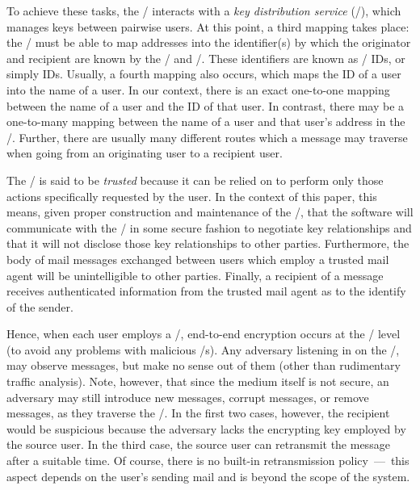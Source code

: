 To achieve these tasks,
the \TMA/ interacts with a {\it key distribution service} (\KDS/),
which manages keys between pairwise users.
At this point, a third mapping takes place:
the \UA/ must be able to map addresses into the identifier(s)
by which the originator and recipient are known by the \TMA/ and \KDS/.
These identifiers are known as \KDS/ IDs, or simply IDs.
Usually, a fourth mapping also occurs,
which maps the ID of a user into the name of a user.
In our context,
there is an exact one-to-one mapping between the name of a user and the ID
of that user.
In contrast,
there may be a one-to-many mapping between the name of a user and
that user's address in the \MTS/.
Further, there are usually many different routes which a message may traverse
when going from an originating user to a recipient user.

The \TMA/ is said to be {\it trusted} because it can be relied on to perform
only those actions specifically requested by the user.
In the context of this paper,
this means, given proper construction and maintenance of the \TMA/,
that the software will communicate with the \KDC/ in some secure fashion to
negotiate key relationships and that it will not disclose those key
relationships to other parties.
Furthermore,
the body of mail messages exchanged between users which employ
a trusted mail agent will be unintelligible to other parties.
Finally,
a recipient of a message receives authenticated information from the
trusted mail agent as to the identify of the sender.

Hence,
when each user employs a \TMA/,
end-to-end encryption occurs at the \UA/ level
(to avoid any problems with malicious \MTA/s).%
Any adversary listening in on the \MTS/,
may observe messages,
but make no sense out of them
(other than rudimentary traffic analysis).
Note, however,
that since the medium itself is not secure,
an adversary may still introduce new messages,
corrupt messages,
or remove messages,
as they traverse the \MTS/.
In the first two cases, however,
the recipient would be suspicious
because the adversary lacks the encrypting key employed by the source user.
In the third case,
the source user can retransmit the message after a suitable time.
Of course,
there is no built-in retransmission policy~---~this aspect depends on the
user's sending mail and is beyond the scope of the system.

